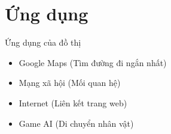 
\section{Ứng dụng}
\begin{frame}{Ứng dụng của đồ thị}
\begin{itemize}
\item Google Maps (Tìm đường đi ngắn nhất)
\item Mạng xã hội (Mối quan hệ)
\item Internet (Liên kết trang web)
\item Game AI (Di chuyển nhân vật)
\end{itemize}
\end{frame}
